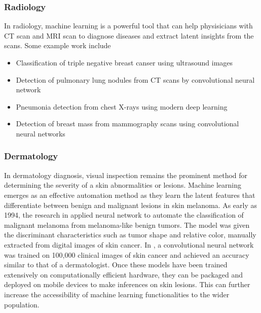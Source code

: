 \documentclass{article}
\begin{document}
\subsubsection{Radiology}
In radiology, machine learning is a powerful tool that can help physisicians with CT scan and MRI scan to diagnose diseases and extract latent insights from the scans. Some example work include
\begin{itemize}
    \item Classification of triple negative breast canser using ultrasound images \cite{wu_machine_2019}
    \item Detection of pulmonary lung nodules from CT scans by convolutional neural network \cite{van_ginneken_off--shelf_2015}
    \item Pneumonia detection from chest X-rays using modern deep learning \cite{rajpurkar_chexnet_2017}
    \item Detection of breast mass from mammography scans using convolutional neural networks \cite{arevalo_convolutional_2015}
\end{itemize} 



\subsubsection{Dermatology}
In dermatology diagnosis, visual inspection remains the prominent method for determining the severity of a skin abnormalities or lesions. 
Machine learning emerges as an effective automation method as they learn the latent features that differentiate between benign and malignant lesions in skin melanoma. 
As early as 1994, the research in \cite{ercal_neural_1994} applied neural network to automate the classification of malignant melanoma from melanoma-like benign tumors.
The model was given the discriminant characteristics such as tumor shape and relative color, manually extracted from digital images of skin cancer.
In \cite{esteva_dermatologist-level_2017}, a convolutional neural network was trained on 100,000 clinical images of skin cancer and achieved an accuracy similar to that of a dermatologist.
Once these models have been trained extensively on computationally efficient hardware, they can be packaged and deployed on mobile devices to make inferences on skin lesions. 
This can further increase the accessibility of machine learning functionalities to the wider population.
\end{document}

